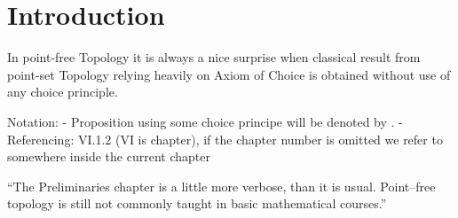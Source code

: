 \chapter{Introduction}
\cite{picado2011frames}

In point-free Topology it is always a nice surprise when classical result from point-set Topology relying heavily on Axiom of Choice is obtained without use of any choice principle.


Notation:
- Proposition using some choice principe will be denoted by \ACPStar.
- Referencing: VI.1.2 (VI is chapter), if the chapter number is omitted we refer to somewhere inside the current chapter

``The Preliminaries chapter is a little more verbose, than it is usual. Point--free topology is still not commonly taught in basic mathematical courses.''

